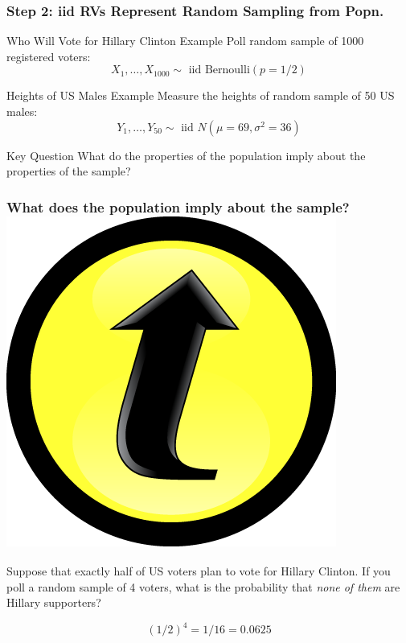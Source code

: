\documentclass[handout]{beamer}
\begin{document}
\begin{frame}
  \frametitle{Step 2: iid RVs Represent Random Sampling from Popn.}
  \begin{block}{Who Will Vote for Hillary Clinton Example}
   Poll random sample of 1000 registered voters:
   $$X_1, \hdots, X_{1000} \sim \mbox{ iid Bernoulli}(p = 1/2)$$
  \end{block}
  \begin{block}{Heights of US Males Example}
   Measure the heights of random sample of 50 US males:
   $$Y_1, \hdots, Y_{50}  \sim \mbox{ iid } N(\mu = 69, \sigma^2 = 36)$$
  \end{block}

  \begin{block}{Key Question}
   What do the properties of the population imply about the properties of the sample? 
  \end{block}
\end{frame}
\begin{frame}
  \frametitle{What does the population imply about the sample? \hfill\includegraphics[scale = 0.05]{./images/clicker}}
Suppose that exactly half of US voters plan to vote for Hillary Clinton. 
If you poll a random sample of 4 voters, what is the probability that \emph{none of them} are Hillary supporters?

\pause

\alert{$$(1/2)^4 = 1/16 = 0.0625$$}
\end{frame}
\end{document}
